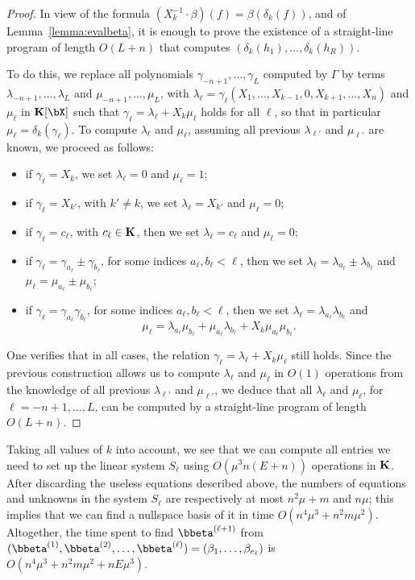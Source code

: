 \documentclass[12pt]{article}
\begin{document}
\begin{proof}
  In view of the formula $(X_k^{-1} \cdot
  \beta)(f)=\beta(\delta_k(f))$, and of Lemma~\ref{lemma:evalbeta}, it is
  enough to prove the existence of a straight-line program of length
  $O(L+n)$ that computes $(\delta_k(h_1),\dots,\delta_k(h_R))$.

  To do this, we replace all polynomials
  $\gamma_{-n+1},\dots,\gamma_L$ computed by $\Gamma$ by terms
  $\lambda_{-n+1},\dots,\lambda_L$ and $\mu_{-n+1},\dots,\mu_L$, with
  $\lambda_\ell=\gamma_\ell(X_1,\dots,X_{k-1},0,X_{k+1},\dots,X_n)$
  and $\mu_\ell$ in $\KK[\bX]$ such that $\gamma_\ell= \lambda_\ell+X_k
  \mu_\ell$ holds for all $\ell$, so that in particular
  $\mu_\ell=\delta_k(\gamma_\ell)$.  To compute $\lambda_\ell$ and
  $\mu_\ell$, assuming all previous $\lambda_{\ell'}$ and
  $\mu_{\ell'}$ are known, we proceed as follows:
  \begin{itemize}
  \item if $\gamma_\ell=X_k$, we set $\lambda_\ell=0$ and $\mu_\ell=1$;
  \item if $\gamma_\ell=X_{k'}$, with $k' \ne k$, we set $\lambda_\ell=X_{k'}$ and $\mu_\ell=0$;
  \item if $\gamma_\ell =c_\ell$, with $c_\ell \in \mathbf{K}$,
    then we set $\lambda_\ell=c_\ell$ and  $\mu_\ell=0$;
  \item if $\gamma_\ell = \gamma_{a_\ell} \pm \gamma_{b_\ell}$,
    for some indices $a_\ell,b_\ell < \ell$, 
    then we set $\lambda_\ell=\lambda_{a_\ell}\pm\lambda_{b_\ell}$
    and $\mu_\ell=\mu_{a_\ell}\pm\mu_{b_\ell}$;
\item if $\gamma_\ell = \gamma_{a_\ell} \gamma_{b_\ell}$,
      for some indices $a_\ell,b_\ell < \ell$,
    then we set $\lambda_\ell=\lambda_{a_\ell} \lambda_{b_\ell}$
    and $$\mu_\ell=
\lambda_{a_\ell} \mu_{b_\ell}
+
\mu_{a_\ell} \lambda_{b_\ell}
+
X_k\mu_{a_\ell} \mu_{b_\ell}.$$
\end{itemize}
One verifies that in all cases, the relation $\gamma_\ell=
\lambda_\ell+X_k \mu_\ell$ still holds. Since the previous
construction allows us to compute $\lambda_\ell$ and $\mu_\ell$ in
$O(1)$ operations from the knowledge of all previous $\lambda_{\ell'}$
and $\mu_{\ell'}$, we deduce that all $\lambda_\ell$ and $\mu_\ell$,
for $\ell=-n+1,\dots,L$, can be computed by a straight-line program of
length $O(L+n)$.
\end{proof}

Taking all values of $k$ into account, we see that we can compute all
entries we need to set up the linear system $S_\ell$ using $O(\mu^3
n(E+n))$ operations in $\mathbf{K}$. After discarding the useless equations
described above, the numbers of equations and unknowns in the system
$S_\ell$ are respectively at most $n^2 \mu+m$ and $n \mu$; this
implies that we can find a nullspace basis of it in time $O(n^4 \mu^3
+ n^2 m \mu^2)$. Altogether, the time spent to find
$\bbeta^{(\ell+1)}$ from
$(\bbeta^{(1)},\bbeta^{(2)},\dots,\bbeta^{(\ell)})=(\beta_{1},\dots,\beta_{e_\ell})$
is $O(n^4 \mu^3 + n^2 m \mu^2 + n E \mu^3)$.
\end{document}
